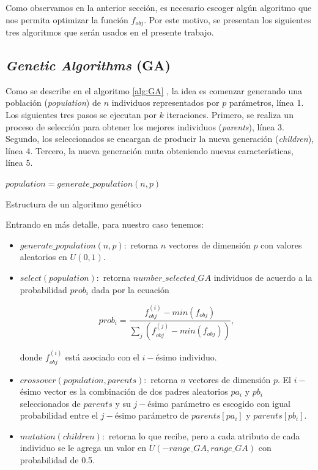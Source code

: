 Como observamos en la anterior sección, es necesario escoger algún algoritmo
que nos permita optimizar la función $f_{obj}$. 
Por este motivo, se presentan los siguientes tres algoritmos que serán usados en el presente trabajo.

\subsection{\emph{Genetic Algorithms} (GA)}

Como se describe en el algoritmo \ref{alg:GA} \citep{Mykel2019}, la idea es  
comenzar generando una población (\emph{population}) de $n$ individuos representados por $p$
parámetros, línea 1. 
Los siguientes tres pasos se ejecutan por $k$ iteraciones.
Primero, se realiza un proceso de selección para obtener los mejores individuos
(\emph{parents}), línea 3.
Segundo, los seleccionados se encargan de producir la nueva generación
(\emph{children}), línea 4.
Tercero, la nueva generación muta obteniendo nuevas características, línea 5.

\begin{algorithm}
$population = generate\_population(n, p)$ \\
\caption{Estructura de un algoritmo genético}
\label{alg:GA}
\end{algorithm}

Entrando en más detalle, para nuestro caso tenemos:

\begin{itemize}
    \item $generate\_population(n, p):$ retorna $n$ vectores de dimensión $p$
      con valores aleatorios en $U(0, 1)$.

    \item $select(population):$ retorna $number\_selected\_GA$ individuos de
      acuerdo a la probabilidad $prob_i$ dada por la ecuación
    
    \begin{equation}
      prob_i = \frac{f_{obj}^{(i)} - min(f_{obj})}{\displaystyle\sum_{j} (f_{obj}^{(j)} - min(f_{obj}))},
    \label{eq:prob}
    \end{equation}
    
    donde $f_{obj}^{(i)}$ está asociado con el $i-$ésimo individuo.
    
    \item $crossover(population, parents):$ retorna $n$ vectores de dimensión $p$.
    El $i-$ésimo vector es la combinación de dos padres aleatorios $pa_i$
    y $pb_i$ seleccionados de $parents$ y su $j-$ésimo parámetro es escogido
    con igual probabilidad entre el $j-$ésimo parámetro de $parents[pa_i]$
    y $parents[pb_i]$.

    \item $mutation(children):$ retorna lo que recibe, pero a cada atributo de
      cada individuo se le agrega un valor en $U(-range\_GA, range\_GA)$ con
      probabilidad de 0.5.

\end{itemize}

